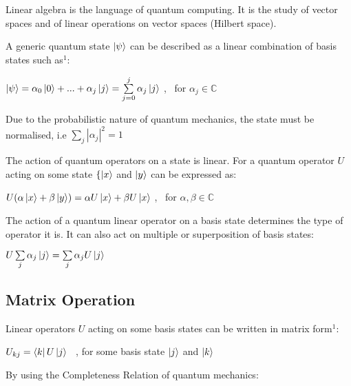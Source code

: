\documentclass{article}
\begin{document}
\noindent
Linear algebra is the language of quantum computing. It is the study of vector spaces and of linear operations on vector
spaces (Hilbert space).
\vspace{5mm}

\noindent
A generic quantum state $\ket{\psi}$ can be described as a linear combination of basis states such as\hyperlink{1}{$^1$}:
\vspace{5mm}


\qquad $\ket{\psi} = \alpha_0\ket{0} + ... + \alpha_j\ket{j} = \sum\limits_{j = 0}^{j} \alpha_j\ket{j}$ , \ for $\alpha_j \in \mathbb{C}$
\vspace{5mm}

\noindent
Due to the probabilistic nature of quantum mechanics, the state must be normalised, i.e $\sum\limits_j |\alpha_j|^2 = 1$
\vspace{5mm}

\noindent
The action of quantum operators on a state is linear. For a quantum operator $U$ acting on some state $\{\ket{x}$ and $\ket{y}$ can be expressed as:
\vspace{5mm}

\noindent
\qquad $U(\alpha\ket{x} + \beta\ket{y}) = \alpha U\ket{x} + \beta U\ket{x}$ , \ for $\alpha, \beta \in \mathbb{C}$
\vspace{5mm}

\noindent
The action of a quantum linear operator on a basis state determines the type of operator it is. It can also act on multiple or superposition of basis states:
\vspace{5mm}

\noindent
\qquad $U \sum\limits_j \alpha_j \ket{j} = \sum\limits_j \alpha_j U\ket{j}$
\vspace{10mm}

\subsection{Matrix Operation}
\vspace{5mm}

\noindent
Linear operators $U$ acting on some basis states can be written in matrix form\hyperlink{1}{$^1$}:
\vspace{5mm}

\qquad $U_{kj} = \bra{k}U\ket{j}$ \ , for some basis state $\ket{j}$ and $\ket{k}$
\vspace{5mm}

\noindent
By using the Completeness Relation of quantum mechanics:
\vspace{5mm}
\end{document}
